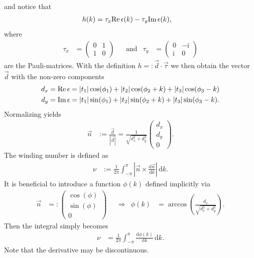 \documentclass[english, parskip=full]{scrartcl}
\newcommand{\intx}{}
\newcommand{\kla}{}
\newcommand{\tecxt}{}
\renewcommand{\i}{\text{i}}
\begin{document}
and notice that
\begin{align}
h(k)&=\tau_x\tecxt\text{Re\,}\epsilon(k)-\tau_y\tecxt\text{Im\,}\epsilon(k),
\end{align}
where 
\begin{align}
\tau_x&=\begin{pmatrix}
0&1\\1&0
\end{pmatrix}&&\tecxt\text{and}&\tau_y&=\begin{pmatrix}
0&-\i\\ \i&0
\end{pmatrix}
\end{align}
are the Pauli-matrices. 
With the definition $h=:\vec{d}\cdot\vec{\tau}$ we then obtain the vector $\vec{d}$ with the non-zero components
\begin{align}
d_x&=\tecxt\text{Re\,}\epsilon=|t_1|\cos(\phi_1) + |t_2|\cos(\phi_2+k) + |t_3|\cos(\phi_3-k)\\
d_y&=\tecxt\text{Im\,}\epsilon=|t_1|\sin(\phi_1) + |t_2|\sin(\phi_2+k) + |t_3|\sin(\phi_3-k).
\end{align}
Normalizing yields
\begin{align}
\vec{n}&:=\frac{\vec{d}}{|\vec{d}|}=\frac{1}{\sqrt{d_x^2+d_y^2}}\begin{pmatrix}
d_x\\ d_y \\ 0
\end{pmatrix}.
\end{align}
The winding number is defined as
\begin{align}
\nu&:=\frac{1}{2\pi}\intx\int_{-\pi}^{\pi}\left\vert\vec{n}\times\frac{\tecxt\text{d}\vec{n}}{\tecxt\text{d}k}\right\vert\, \mathrm{d}k.
\end{align}
It is beneficial to introduce a function $\phi(k)$ defined implicitly via
\begin{align}
\vec{n}&=:\begin{pmatrix}
\cos(\phi) \\ \sin(\phi) \\ 0
\end{pmatrix}&&\Rightarrow&\phi(k)&=\arccos\kla\left( \frac{d_x}{\sqrt{d_x^2+d_y^2}} \right).
\end{align}
Then the integral simply becomes
\begin{align}
\nu&=\frac{1}{2\pi}\intx\int_{-\pi}^{\pi}\frac{\tecxt\text{d}\phi(k)}{\tecxt\text{d}k}\, \mathrm{d}k.
\end{align}
Note that the derivative may be discontinuous. 
\end{document}
